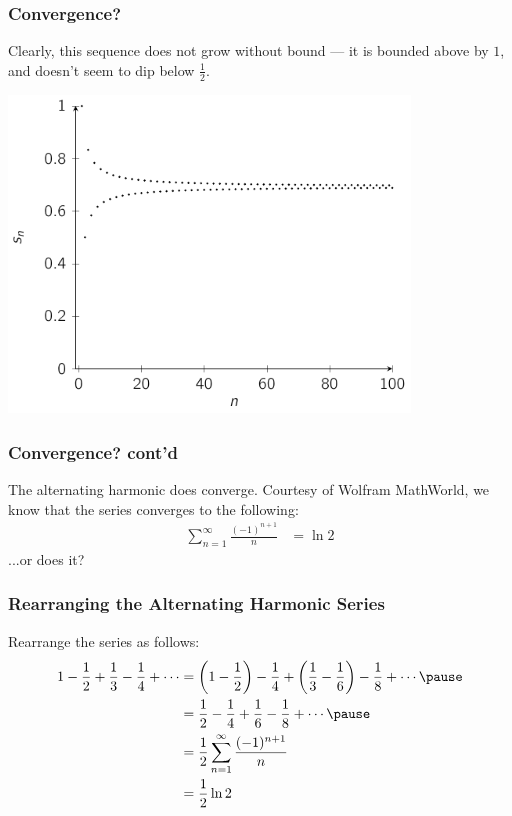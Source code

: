 \documentclass{beamer}
\begin{document}
\begin{frame}
  \frametitle{Convergence?}
  Clearly, this sequence does not grow without bound --- it is bounded above by $1$, and doesn't seem to dip below $\frac{1}{2}$.\pause
  \begin{center}
    \includegraphics[width=0.8\textwidth]{images/alternating_harmonic_series_plot.pdf}
  \end{center}
\end{frame}
\begin{frame}
  \frametitle{Convergence? cont'd}
  The alternating harmonic does converge. Courtesy of Wolfram MathWorld, we know that the series converges to the following:
  \begin{align*}
    \sum_{n=1}^{\infty}\frac{(-1)^{n+1}}{n} &= \ln 2
  \end{align*}\pause
  ...or does it? 
\end{frame}
\begin{frame}
  \frametitle{Rearranging the Alternating Harmonic Series}
  Rearrange the series as follows:
  \begin{align*}
    1 - \frac{1}{2} + \frac{1}{3} - \frac{1}{4} + \cdots &= \left(1-\frac{1}{2}\right) - \frac{1}{4} + \left(\frac{1}{3} - \frac{1}{6}\right) - \frac{1}{8} + \cdots\pause\\
                                                                       &= \frac{1}{2} - \frac{1}{4} + \frac{1}{6} - \frac{1}{8} + \cdots\pause\\
                                                                       &= \frac{1}{2}\sum_{n=1}^{\infty}\frac{(-1)^{n+1}}{n}\\
                                                                       &= \frac{1}{2}\ln 2
  \end{align*}
\end{frame}
\end{document}
